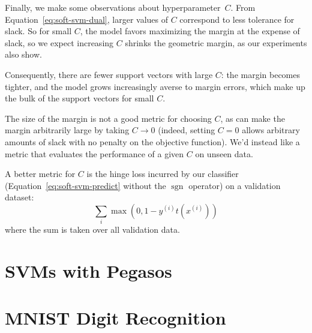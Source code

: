 \documentclass{article}
\DeclareMathOperator{\sgn}{sgn}
\newcommand{\sind}[1]{^{(#1)}}
\begin{document}
\begin{multicols}{2}



Finally, we make some observations about hyperparameter~$C$.
From Equation~\ref{eq:soft-svm-dual},
larger values of $C$ correspond to less tolerance for slack.
So for small $C$,
the model favors
maximizing the margin at the expense of slack,
so we expect increasing $C$ shrinks the geometric margin,
as our experiments also show.

Consequently, there are fewer support vectors with large $C$:
the margin becomes tighter,
and the model grows increasingly averse to margin errors,
which make up the bulk of the support vectors for small $C$.

The size of the margin
is not a good metric for choosing $C$,
as can make the margin arbitrarily large
by taking $C \to 0$
(indeed, setting $C = 0$ allows arbitrary amounts of slack
with no penalty on the objective function).
We'd instead like a metric that evaluates
the performance of a given $C$
on unseen data.

A better metric for $C$ is
the hinge loss incurred by our classifier
(Equation~\ref{eq:soft-svm-predict} without the $\sgn$ operator)
on a validation dataset:
\begin{equation}
    \sum_{i} \max(0, 1 - y\sind{i} t(x\sind{i}))
\end{equation}
where the sum is taken over all validation data.



\section{SVMs with Pegasos}


\section{MNIST Digit Recognition}


\end{multicols}
\end{document}
